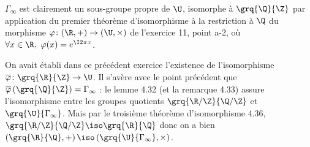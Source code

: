
$\Gamma_{\infty}$ est clairement un sous-groupe propre de $\U$, isomorphe à $\grq{\Q}{\Z}$ par application du premier théorème d'isomorphisme à la restriction à $\Q$ du morphisme $\varphi \colon (\R,+)\to (\U,\times)$ de l'exercice 11, point a-2, où $\forall x\in \R,~ \varphi(x) = e^{\I 2\pi x}$.

On avait établi dans ce précédent exercice l'existence de l'isomorphisme $\overline{\varphi}\colon \grq{\R}{\Z}\to \U$. Il s'avère avec le point précédent que $\overline{\varphi}\left(\grq{\Q}{\Z} \right) = \Gamma_{\infty}$ : le lemme 4.32 (et la remarque 4.33) assure l'isomorphisme entre les groupes quotients $\grq{\R/\Z}{\Q/\Z}$ et $\grq{\U}{\Gamma_{\infty}}$. Mais par le troisième théorème d'isomorphisme 4.36,
$\grq{\R/\Z}{\Q/\Z}\iso \grq{\R}{\Q}$ donc on a bien $\left(\grq{\R}{\Q},+\right)\iso \left(\grq{\U}{\Gamma_{\infty}},\times\right)$.


